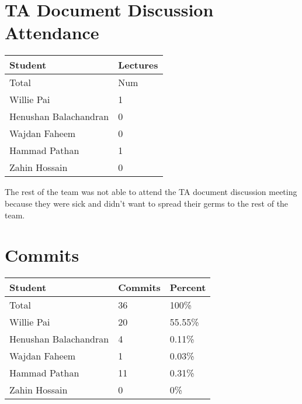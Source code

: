 \documentclass{article}
\begin{document}

\section{TA Document Discussion Attendance}


\begin{table}[H]
\centering
\begin{tabular}{ll}
\toprule
\textbf{Student} & \textbf{Lectures}\\
\midrule
Total & Num\\
Willie Pai & 1\\
Henushan Balachandran & 0\\
Wajdan Faheem & 0\\
Hammad Pathan & 1\\
Zahin Hossain & 0\\
\bottomrule
\end{tabular}
\end{table}

The rest of the team was not able to attend the TA document discussion meeting because they were sick and didn't want to spread their germs to the rest of the team.

\section{Commits}


\begin{table}[H]
\centering
\begin{tabular}{lll}
\toprule
\textbf{Student} & \textbf{Commits} & \textbf{Percent}\\
\midrule
Total & 36 & 100\% \\
Willie Pai & 20 & 55.55\% \\
Henushan Balachandran & 4 & 0.11\% \\
Wajdan Faheem & 1 & 0.03\% \\
Hammad Pathan & 11 & 0.31\% \\
Zahin Hossain & 0 & 0\% \\
\bottomrule
\end{tabular}
\end{table}
\end{document}
